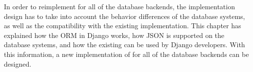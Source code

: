 In order to reimplement  for all of the database backends, the
implementation design has to take into account the behavior differences of the
database systems, as well as the compatibility with the existing
implementation. This chapter has explained how the ORM in Django works, how
JSON is supported on the database systems, and how the existing
 can be used by Django developers. With this information, a new
implementation of  for all of the database backends can be
designed.
